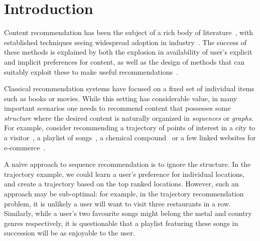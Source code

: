
\section{Introduction}
\label{sec:intro}

Content recommendation has been the subject of a rich body of literature~\citep{Goldberg:1992,Sarwar:2001,Koren:2010},
with established techniques seeing widespread adoption in industry~\citep{Linden:2003,Agarwal:2013,Amatriain:2015,Gomez-Uribe:2015}.
The success of these methods is explained by both the explosion in availability of user's explicit and implicit preferences for content,
as well as the design of methods that can suitably exploit these to make useful recommendations~\citep{Koren:2009}.

Classical recommendation systems have focused on a fixed set of individual items such as books or movies. %
While this setting has considerable value,
in many important scenarios one needs to recommend content that possesses some \emph{structure}%
where the desired content is naturally organized in
\emph{sequences} or {\em graphs}.
For example, consider %
recommending a trajectory of points of interest in a city to a visitor~\citep{lu2010photo2trip,lu2012personalized,ijcai15,cikm16paper}, 
a playlist of songs~\citep{McFee:2011,chen2012playlist,hidasi2015session,choi2016towards},
a chemical compound~\cite{dehaspe1998finding} or a few linked websites for e-commerce~\cite{antikacioglu2015recommendation}.
%

A na\"{i}ve approach to sequence recommendation is to ignore the structure.
In the trajectory example, we could learn a user's preference for individual locations,
and create a trajectory based on the top ranked locations.
However, such an approach may be sub-optimal:
for example,
in the trajectory recommendation problem, it is unlikely a user will want to visit three restaurants in a row.
Similarly,
while a user's two favourite songs might belong
the metal and country genres respectively,
it is questionable that a playlist featuring these songs in succession will be as enjoyable to the user.

